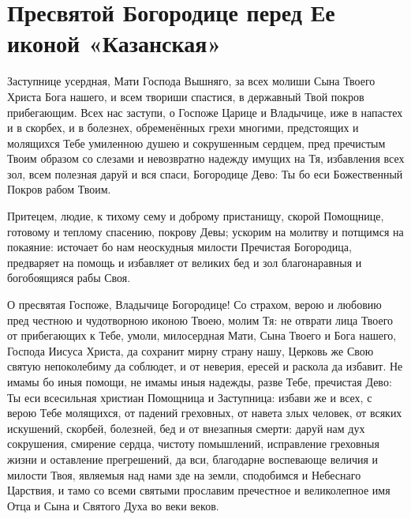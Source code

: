 \section{Пресвятой Богородице перед Ее иконой «Казанская»}\begin{mymulticols}


Заступнице усердная, Мати Господа Вышняго, за всех молиши Сына Твоего Христа Бога нашего, и всем твориши спастися, в державный Твой покров прибегающим. Всех нас заступи, о Госпоже Царице и Владычице, иже в напастех и в скорбех, и в болезнех, обременённых грехи многими, предстоящих и молящихся Тебе умиленною душею и сокрушенным сердцем, пред пречистым Твоим образом со слезами и невозвратно надежду имущих на Тя, избавления всех зол, всем полезная даруй и вся спаси, Богородице Дево: Ты бо еси Божественный Покров рабом Твоим.


Притецем, людие, к тихому сему и доброму пристанищу, скорой Помощнице, готовому и теплому спасению, покрову Девы; ускорим на молитву и потщимся на покаяние: источает бо нам неоскудныя милости Пречистая Богородица, предваряет на помощь и избавляет от великих бед и зол благонаравныя и богобоящияся рабы Своя.


О пресвятая Госпоже, Владычице Богородице! Со страхом, верою и любовию пред честною и чудотворною иконою Твоею, молим Тя: не отврати лица Твоего от прибегающих к Тебе, умоли, милосердная Мати, Сына Твоего и Бога нашего, Господа Иисуса Христа, да сохранит мирну страну нашу, Церковь же Свою святую непоколебиму да соблюдет, и от неверия, ересей и раскола да избавит. Не имамы бо иныя помощи, не имамы иныя надежды, разве Тебе, пречистая Дево: Ты еси всесильная христиан Помощница и Заступница: избави же и всех, с верою Тебе молящихся, от падений греховных, от навета злых человек, от всяких искушений, скорбей, болезней, бед и от внезапныя смерти: даруй нам дух сокрушения, смирение сердца, чистоту помышлений, исправление греховныя жизни и оставление прегрешений, да вси, благодарне воспевающе величия и милости Твоя, являемыя над нами зде на земли, сподобимся и Небеснаго Царствия, и тамо со всеми святыми прославим пречестное и великолепное имя Отца и Сына и Святого Духа во веки веков.

\end{mymulticols}

